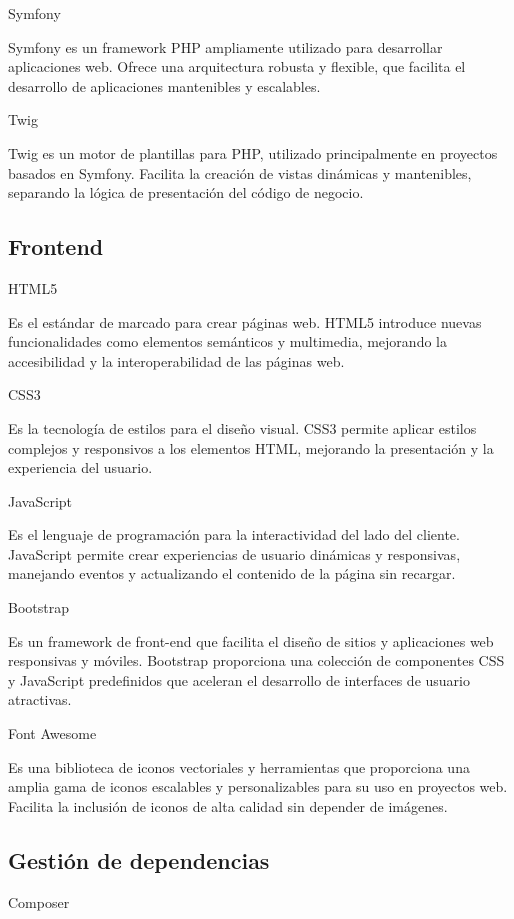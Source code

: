 Symfony

Symfony es un framework PHP ampliamente utilizado para desarrollar aplicaciones web.
Ofrece una arquitectura robusta y flexible, que facilita el desarrollo de aplicaciones mantenibles y escalables.

Twig

Twig es un motor de plantillas para PHP, utilizado principalmente en proyectos basados en
Symfony.
Facilita la creación de vistas dinámicas y mantenibles, separando la lógica de presentación del código de negocio.

\subsection{Frontend}

HTML5

Es el estándar de marcado para crear páginas web.
HTML5 introduce nuevas funcionalidades como elementos semánticos y multimedia, mejorando la accesibilidad y la
interoperabilidad de las páginas web.

CSS3

Es la tecnología de estilos para el diseño visual.
CSS3 permite aplicar estilos complejos y responsivos a los elementos HTML, mejorando la presentación y la experiencia
del usuario.

JavaScript

Es el lenguaje de programación para la interactividad del lado del cliente.
JavaScript permite crear experiencias de usuario dinámicas y responsivas, manejando eventos y actualizando el contenido
de la página sin recargar.

Bootstrap

Es un framework de front-end que facilita el diseño de sitios y aplicaciones web
responsivas y móviles.
Bootstrap proporciona una colección de componentes CSS
y JavaScript predefinidos que aceleran el desarrollo de interfaces de usuario atractivas.

Font Awesome

Es una biblioteca de iconos vectoriales y herramientas que proporciona una amplia gama de
iconos escalables y personalizables para su uso en proyectos web.
Facilita la inclusión de iconos de alta calidad sin depender de imágenes.

\subsection{Gestión de dependencias}

Composer

